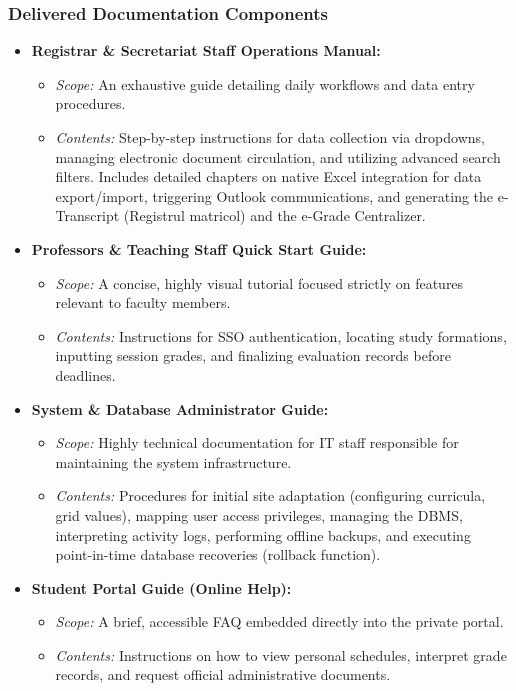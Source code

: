 \documentclass[11pt, a4paper]{article}
\begin{document}
\subsubsection{Delivered Documentation Components}
\begin{itemize}
    \item \textbf{Registrar \& Secretariat Staff Operations Manual:}
    \begin{itemize}
        \item \textit{Scope:} An exhaustive guide detailing daily workflows and data entry procedures.
        \item \textit{Contents:} Step-by-step instructions for data collection via dropdowns, managing electronic document circulation, and utilizing advanced search filters. Includes detailed chapters on native Excel integration for data export/import, triggering Outlook communications, and generating the e-Transcript (Registrul matricol) and the e-Grade Centralizer.
    \end{itemize}
    \item \textbf{Professors \& Teaching Staff Quick Start Guide:}
    \begin{itemize}
        \item \textit{Scope:} A concise, highly visual tutorial focused strictly on features relevant to faculty members.
        \item \textit{Contents:} Instructions for SSO authentication, locating study formations, inputting session grades, and finalizing evaluation records before deadlines.
    \end{itemize}
    \item \textbf{System \& Database Administrator Guide:}
    \begin{itemize}
        \item \textit{Scope:} Highly technical documentation for IT staff responsible for maintaining the system infrastructure.
        \item \textit{Contents:} Procedures for initial site adaptation (configuring curricula, grid values), mapping user access privileges, managing the DBMS, interpreting activity logs, performing offline backups, and executing point-in-time database recoveries (rollback function).
    \end{itemize}
    \item \textbf{Student Portal Guide (Online Help):}
    \begin{itemize}
        \item \textit{Scope:} A brief, accessible FAQ embedded directly into the private portal.
        \item \textit{Contents:} Instructions on how to view personal schedules, interpret grade records, and request official administrative documents.
    \end{itemize}
\end{itemize}
\end{document}
